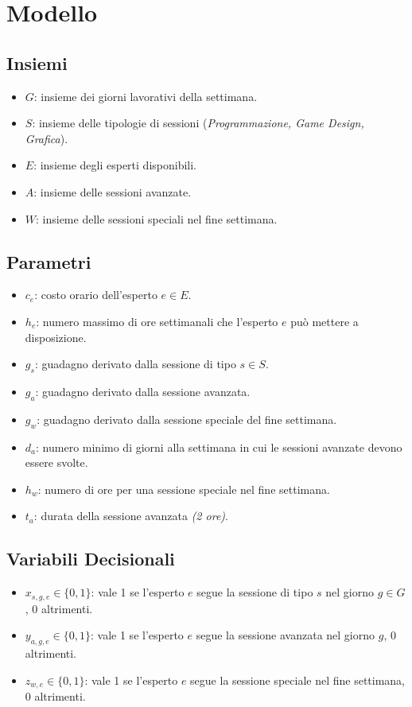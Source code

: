 \documentclass[12pt]{article}
\begin{document}
    \section{Modello}
    \subsection{Insiemi}
    \begin{itemize}
        \item $G$: insieme dei giorni lavorativi della settimana.
        \item $S$: insieme delle tipologie di sessioni (\textit{Programmazione, Game Design, Grafica}).
        \item $E$: insieme degli esperti disponibili.
        \item $A$: insieme delle sessioni avanzate.
        \item $W$: insieme delle sessioni speciali nel fine settimana.
    \end{itemize}
    \subsection{Parametri}
    \begin{itemize}
        \item $c_{e}$: costo orario dell'esperto $e \in E$.
        \item $h_{e}$: numero massimo di ore settimanali che l'esperto $e$ può mettere a disposizione.
        \item $g_{s}$: guadagno derivato dalla sessione di tipo $s \in S$.
        \item $g_{a}$: guadagno derivato dalla sessione avanzata.
        \item $g_{w}$: guadagno derivato dalla sessione speciale del fine settimana.
        \item $d_{a}$: numero minimo di giorni alla settimana in cui le sessioni avanzate devono essere svolte.
        \item $h_{w}$: numero di ore per una sessione speciale nel fine settimana.
        \item $t_{a}$: durata della sessione avanzata \textit{(2 ore)}.
    \end{itemize}
    \subsection{Variabili Decisionali}
    \begin{itemize}
        \item $x_{s,g,e} \in \{0,1\}$: vale 1 se l'esperto $e$ segue la sessione di tipo $s$ nel giorno $g \in G$, 0 altrimenti.
        \item $y_{a,g,e} \in \{0,1\}$: vale 1 se l'esperto $e$ segue la sessione avanzata nel giorno $g$, 0 altrimenti.
        \item $z_{w,e} \in \{0,1\}$: vale 1 se l'esperto $e$ segue la sessione speciale nel fine settimana, 0 altrimenti.
    \end{itemize}
\end{document}
